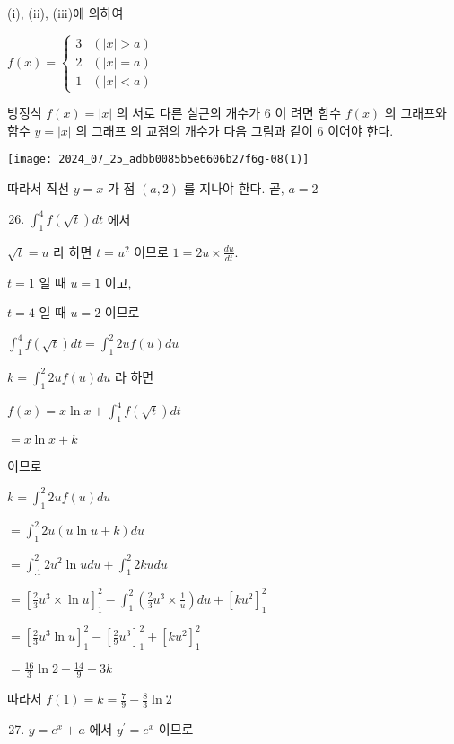 \documentclass[10pt]{article}
\begin{document}
(i), (ii), (iii)에 의하여

$f(x)= \begin{cases}3 & (|x|>a) \\ 2 & (|x|=a) \\ 1 & (|x|<a)\end{cases}$

방정식 $f(x)=|x|$ 의 서로 다른 실근의 개수가 6 이 려면 함수 $f(x)$ 의 그래프와 함수 $y=|x|$ 의 그래프 의 교점의 개수가 다음 그림과 같이 6 이어야 한다.

\begin{center}
\texttt{[image: 2024\_07\_25\_adbb0085b5e6606b27f6g-08(1)]}
\end{center}

따라서 직선 $y=x$ 가 점 $(a, 2)$ 를 지나야 한다. 곧, $a=2$

\begin{enumerate}
  \setcounter{enumi}{25}
  \item $\int_{1}^{4} f(\sqrt{t}) d t$ 에서
\end{enumerate}

$\sqrt{t}=u$ 라 하면 $t=u^{2}$ 이므로 $1=2 u \times \frac{d u}{d t}$.

$t=1$ 일 때 $u=1$ 이고,

$t=4$ 일 때 $u=2$ 이므로

$\int_{1}^{4} f(\sqrt{t}) d t=\int_{1}^{2} 2 u f(u) d u$

$k=\int_{1}^{2} 2 u f(u) d u$ 라 하면

$f(x)=x \ln x+\int_{1}^{4} f(\sqrt{t}) d t$

$=x \ln x+k$

이므로

$k=\int_{1}^{2} 2 u f(u) d u$

$=\int_{1}^{2} 2 u(u \ln u+k) d u$

$=\int_{.1}^{2} 2 u^{2} \ln u d u+\int_{1}^{2} 2 k u d u$

$=\left[\frac{2}{3} u^{3} \times \ln u\right]_{1}^{2}-\int_{1}^{2}\left(\frac{2}{3} u^{3} \times \frac{1}{u}\right) d u+\left[k u^{2}\right]_{1}^{2}$

$=\left[\frac{2}{3} u^{3} \ln u\right]_{1}^{2}-\left[\frac{2}{9} u^{3}\right]_{1}^{2}+\left[k u^{2}\right]_{1}^{2}$

$=\frac{16}{3} \ln 2-\frac{14}{9}+3 k$

따라서 $f(1)=k=\frac{7}{9}-\frac{8}{3} \ln 2$

\begin{enumerate}
  \setcounter{enumi}{26}
  \item $y=e^{x}+a$ 에서 $y^{\prime}=e^{x}$ 이므로
\end{enumerate}
\end{document}
